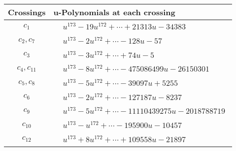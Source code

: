 \documentclass[1p]{elsarticle_modified}
\theoremstyle{definition}
\begin{document}
\begin{tabular}{m{50pt}|m{274pt}}
Crossings & \hspace{64pt}u-Polynomials at each crossing \\
\hline $$\begin{aligned}c_{1}\end{aligned}$$&$\begin{aligned}
&u^{173}-19 u^{172}+\cdots+21313 u-34383
\end{aligned}$\\
\hline $$\begin{aligned}c_{2},c_{7}\end{aligned}$$&$\begin{aligned}
&u^{173}-2 u^{172}+\cdots-128 u-57
\end{aligned}$\\
\hline $$\begin{aligned}c_{3}\end{aligned}$$&$\begin{aligned}
&u^{173}-3 u^{172}+\cdots+74 u-5
\end{aligned}$\\
\hline $$\begin{aligned}c_{4},c_{11}\end{aligned}$$&$\begin{aligned}
&u^{173}-8 u^{172}+\cdots-475086499 u-26150301
\end{aligned}$\\
\hline $$\begin{aligned}c_{5},c_{8}\end{aligned}$$&$\begin{aligned}
&u^{173}-5 u^{172}+\cdots-39097 u+5255
\end{aligned}$\\
\hline $$\begin{aligned}c_{6}\end{aligned}$$&$\begin{aligned}
&u^{173}-2 u^{172}+\cdots-127187 u-8237
\end{aligned}$\\
\hline $$\begin{aligned}c_{9}\end{aligned}$$&$\begin{aligned}
&u^{173}-5 u^{172}+\cdots-11110439275 u-2018788719
\end{aligned}$\\
\hline $$\begin{aligned}c_{10}\end{aligned}$$&$\begin{aligned}
&u^{173}- u^{172}+\cdots-195900 u-10457
\end{aligned}$\\
\hline $$\begin{aligned}c_{12}\end{aligned}$$&$\begin{aligned}
&u^{173}+8 u^{172}+\cdots+109558 u-21897
\end{aligned}$\\
\hline
\end{tabular}\\~\\
\end{document}
